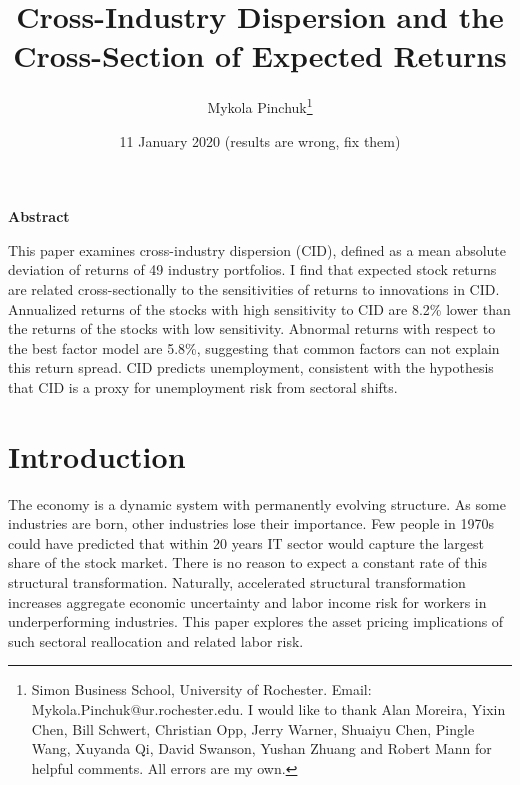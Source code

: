 \documentclass[12pt]{article}
\begin{document}
\onehalfspacing      %
\renewcommand{\footnote}{\endnote}  %

\author{\large{Mykola Pinchuk}\thanks{\rm Simon Business School, University of Rochester. Email: Mykola.Pinchuk@ur.rochester.edu. \newline I would like to thank Alan Moreira, Yixin Chen, Bill Schwert, Christian Opp, Jerry Warner, Shuaiyu Chen, Pingle Wang, Xuyanda Qi, David Swanson, Yushan Zhuang and Robert Mann for helpful comments. All errors are my own.}}

\title{\bf Cross-Industry Dispersion and the Cross-Section of Expected Returns}

\date{11 January 2020 (results are wrong, fix them)}  

\maketitle
\thispagestyle{empty}

\bigskip

\normalsize
\vspace{1cm}

\centerline{\bf Abstract}

\vspace{0.5cm}

\begin{onehalfspace}  %
  \noindent This paper examines cross-industry dispersion (CID), defined as a mean absolute deviation of returns of 49 industry portfolios. I find that expected stock returns are related cross-sectionally to the sensitivities of returns to innovations in CID. Annualized returns of the stocks with high sensitivity to CID are 8.2\% lower than the returns of the stocks with low sensitivity. Abnormal returns with respect to the best factor model are 5.8\%, suggesting that common factors can not explain this return spread. CID predicts unemployment, consistent with the hypothesis that CID is a proxy for unemployment risk from sectoral shifts. 
\end{onehalfspace}
\medskip


\clearpage
{}


\section{Introduction} \label{sec:Model}
The economy is a dynamic system with permanently evolving structure. As some industries are born, other industries lose their importance. Few people in 1970s could have predicted that within 20 years IT sector would capture the largest share of the stock market. There is no reason to expect a constant rate of this structural transformation. Naturally, accelerated structural transformation increases aggregate economic uncertainty and labor income risk for workers in underperforming industries. This paper explores the asset pricing implications of such sectoral reallocation and related labor risk.
\end{document}

